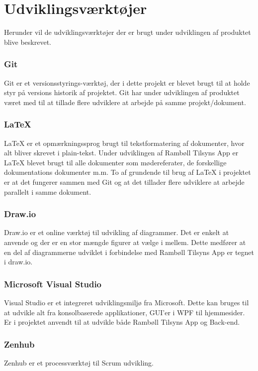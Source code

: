 \chapter{Udviklingsværktøjer}
Herunder vil de udviklingsværktøjer der er brugt under udviklingen af 
produktet blive beskrevet.

\subsection*{Git}
Git\cite{GitRef} er et versionsstyrings-værktøj, der i dette projekt er 
blevet brugt til at holde styr på versions historik af projektet. Git har under 
udviklingen af produktet været med til at tillade flere udviklere at 
arbejde på samme projekt/dokument.

\subsection*{\LaTeX}
\LaTeX \cite{LatexRef} er et opmærkningssprog brugt til tekstformatering af 
dokumenter, hvor alt bliver skrevet i plain-tekst. Under udviklingen af 
Rambøll Tilsyns App er LaTeX blevet brugt til alle dokumenter som 
mødereferater, de forskellige dokumentations dokumenter m.m. To af grundende til brug af LaTeX i 
projektet er at det fungerer sammen med Git og at det tillader flere 
udviklere at arbejde parallelt i samme dokument.

\subsection*{Draw.io}
Draw.io\cite{Draw.io} er et online værktøj til udvikling af diagrammer. 
Det er enkelt at anvende og der er en stor mængde figurer at vælge i mellem. Dette medfører at en del af diagrammerne udviklet i forbindelse med Rambøll Tilsyns App er tegnet i draw.io.

\subsection*{Microsoft Visual Studio}
Visual Studio\cite{VisualStudio} er et integreret udviklingsmiljø fra 
Microsoft. Dette kan bruges til at udvikle alt fra konsolbaserede 
applikationer, GUI'er i WPF til hjemmesider. Er i projektet anvendt til at 
udvikle både Rambøll Tilsyns App og Back-end.

\subsection*{Zenhub}
Zenhub \cite{Zenhub} er et processværktøj til Scrum udvikling.

